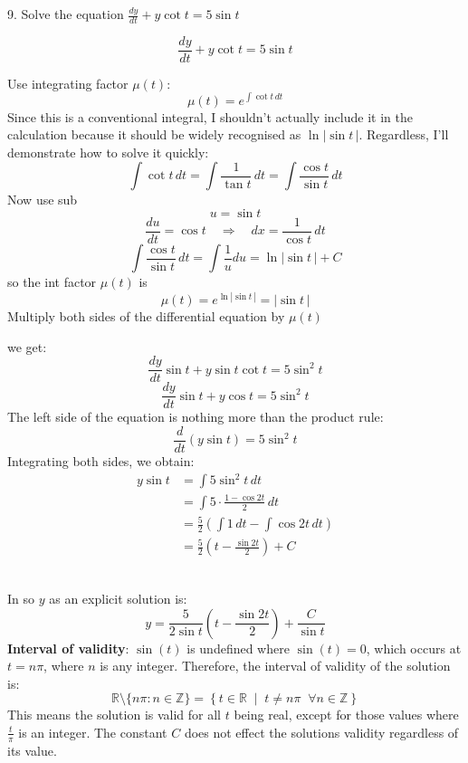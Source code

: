 \documentclass[a4paper, 12pt]{report}
\def\ni{green!60!black!40!white}
\begin{document}
    \begin{tcolorbox}[title={\color{black}\section{Q9}}, colback=white, colframe=\ni, boxrule=1mm, width=1\textwidth]
        9. Solve the equation \( \frac{dy}{dt} + y \cot t = 5 \sin t \)
    \end{tcolorbox}    
    \[\frac{dy}{dt} + y \cot t = 5 \sin t\]
    \begin{minipage}[t]{0.45\textwidth}
        Use integrating factor \( \mu(t) \):
        \[\mu(t) = e^{\int \cot t \, dt}\]
        Since this is a conventional integral, I shouldn't actually include it in the calculation because it should be widely recognised as \(\ln|\sin t \,|\). Regardless, I'll demonstrate how to solve it quickly:        
        \[\int \cot t \, dt = \int \frac{1}{\tan t} \, dt = \int \frac{\cos t}{\sin t} \, dt\]
        Now use sub
        \[u = \sin t\]
        \[\frac{du}{dt} = \cos t \quad \Rightarrow \quad dx = \frac{1}{\cos t} \, dt\]
        \[\int \frac{\cos t}{\sin t} \, dt = \int \frac{1}{u} du = \ln|\sin t\,|+C\]
        so the int factor \(\mu(t)\) is
        \[\mu(t) =e^{\ln |\sin t\,|} = |\sin t\,|\]
        Multiply both sides of the differential equation by \( \mu(t) \)
    \end{minipage}\hfil%
    \begin{minipage}[t]{0.45\textwidth}
    we get:
    \[\frac{dy}{dt}\sin t  + y \sin t \cot t = 5 \sin^2 t\]
    \[\frac{dy}{dt}\sin t  + y\cos t = 5 \sin^2 t\]
    The left side of the equation is nothing more than the product rule:
    \[\frac{d}{dt} (y \sin t) = 5 \sin^2 t\]
    Integrating both sides, we obtain:
    \begin{align*}
        y \sin t &= \int 5 \sin^2 t \, dt\\
        &= \int 5 \cdot \frac{1 - \cos 2t}{2} \, dt\\ 
        &= \frac{5}{2} \left( \int 1 \, dt - \int \cos 2t \, dt \right)\\
        &= \frac{5}{2} \left( t - \frac{\sin 2t}{2} \right) + C
    \end{align*}
    \end{minipage}\\
    In so \(y\) as an explicit solution is:
    \[\boxed{y = \frac{5}{2 \sin t} \left( t - \frac{\sin 2t}{2} \right) + \frac{C}{\sin t}}\]
    \textbf{Interval of validity}: \( \sin(t) \) is undefined where \( \sin(t) = 0 \), which occurs at \( t = n\pi \), where \( n \) is any integer. Therefore, the interval of validity of the solution is:
    \[\mathbb{R} \setminus \{n\pi : n \in \mathbb{Z}\} = \left\{ t \in \mathbb{R} \;\middle|\; t \neq n\pi \;\; \forall n \in \mathbb{Z} \right\}\]    
    This means the solution is valid for all \( t \) being real, except for those values where \( \frac{t}{\pi} \) is an integer. The constant \(C\) does not effect the solutions validity regardless of its value.
    
\end{document}
